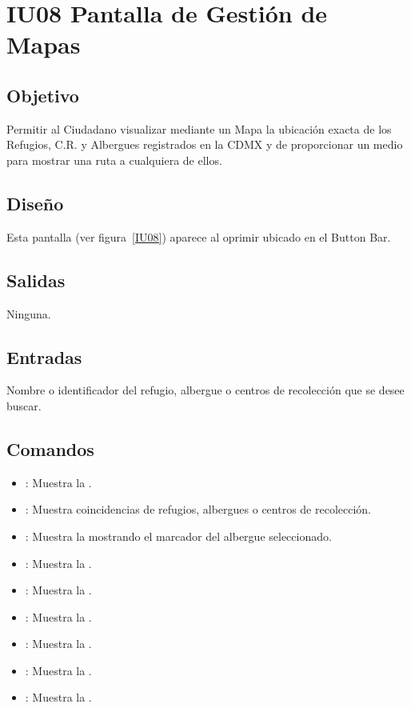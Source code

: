 \section{IU08 Pantalla de Gestión de Mapas}

\subsection{Objetivo}
	Permitir al Ciudadano visualizar mediante un Mapa la ubicación exacta de los Refugios, C.R. y Albergues registrados en la CDMX y de proporcionar un medio para mostrar una ruta a cualquiera de ellos.

\subsection{Diseño}
	Esta pantalla  (ver figura~\ref{IU08}) aparece al oprimir  ubicado en el Button Bar.
	

\subsection{Salidas}

	Ninguna.

\subsection{Entradas}
	Nombre o identificador del refugio, albergue o centros de recolección que se desee buscar.

\subsection{Comandos}
\begin{itemize}
	\item {}: Muestra la .
	\item {}: Muestra coincidencias de refugios, albergues o centros de recolección.
	\item {}: Muestra la  mostrando el marcador del albergue seleccionado.
	\item {}: Muestra la .
	\item {}: Muestra la .
	\item {}: Muestra la .
	\item {}: Muestra la .
	\item {}: Muestra la .
	\item {}: Muestra la .
\end{itemize}

